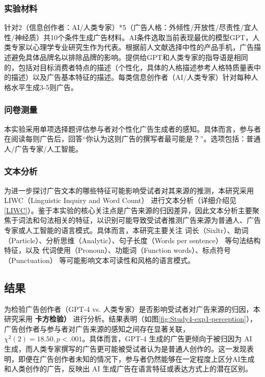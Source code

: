 \subsubsection{实验材料}
针对2（信息创作者：AI/人类专家）*5（广告人格：外倾性/开放性/尽责性/宜人性/神经质）共10个条件生成广告材料。AI条件选取当前表现最优的模型GPT，人类专家以心理学专业研究生作为代表。根据前人文献选择中性的产品手机，广告描述避免具体品牌名以排除品牌的影响。提供给GPT和人类专家的指导语是相同的，包括对目标消费者特点的描述（个性化，具体的人格描述参考人格特质量表中的描述）以及广告基本特征的描述。每类信息创作者（AI/人类专家）针对每种人格水平生成3-5则广告。

\subsubsection{问卷测量}
本实验采用单项选择题评估参与者对个性化广告生成者的感知。具体而言，参与者在阅读每则广告后，回答“你认为这则广告的撰写者最可能是？”。选项包括：普通人/广告专家/人工智能。

\subsubsection{文本分析}
为进一步探讨广告文本的哪些特征可能影响受试者对其来源的推测，本研究采用 LIWC（Linguistic Inquiry and Word Count） 进行文本分析（详细介绍见\ref{LIWC}）。鉴于本实验的核心关注点是广告来源的归因差异，因此文本分析主要聚焦于词法和句法相关的特征，以识别可能导致受试者推测广告来源为普通人、广告专家或人工智能的语言模式。具体而言，本研究主要关注 词长（Sixltr）、助词（Particle）、分析思维（Analytic）、句子长度（Words per sentence） 等句法结构特征，以及 代词使用（Pronoun）、功能词（Function words）、标点符号（Punctuation） 等可能影响文本可读性和风格的语言模式。


\subsection{结果}

为检验广告创作者（GPT-4 vs. 人类专家）是否影响受试者对广告来源的归因，本研究采用 \textbf{卡方检验）} 进行分析。结果表明（如图\ref{fig:Study4-exp1-perception}），广告创作者与参与者对广告来源的感知之间存在显著关联，$\chi^2(2) = 18.50, \textit{p} < .001$。具体而言，GPT-4 生成的广告更倾向于被归因为 AI 生成，而人类专家撰写的广告更可能被受试者认为是普通人创作的。这一发现表明，即便在广告创作者未知的情况下，参与者仍然能够在一定程度上区分AI生成和人类创作的广告，反映出 AI 生成广告在语言特征或表达方式上的潜在区别。

